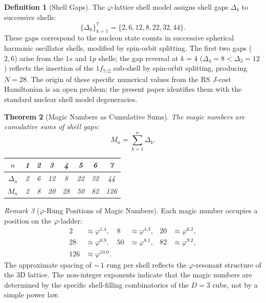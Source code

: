 \documentclass[12pt,a4paper]{article}
\newtheorem{theorem}{Theorem}[section]
\theoremstyle{definition}
\newtheorem{definition}[theorem]{Definition}
\theoremstyle{remark}
\newtheorem{remark}[theorem]{Remark}
\begin{document}
\begin{definition}[Shell Gaps]
The $\varphi$-lattice shell model assigns shell gaps
$\Delta_k$ to successive shells:
\begin{equation}
  \{\Delta_k\}_{k=1}^{7} = \{2, 6, 12, 8, 22, 32, 44\}.
\end{equation}
These gaps correspond to the nucleon state counts in successive
spherical harmonic oscillator shells, modified by spin-orbit
splitting.  The first two gaps ($2, 6$) arise from the $1s$ and
$1p$ shells; the gap reversal at $k=4$ ($\Delta_4 = 8 < \Delta_3 = 12$)
reflects the insertion of the $1f_{7/2}$ sub-shell by spin-orbit
splitting, producing $N = 28$.  The origin of these specific
numerical values from the RS $J$-cost Hamiltonian is an open
problem; the present paper identifies them with the standard
nuclear shell model degeneracies.
\end{definition}

\begin{theorem}[Magic Numbers as Cumulative Sums]
\label{thm:magic}
The magic numbers are cumulative sums of shell gaps:
\begin{equation}
  M_n = \sum_{k=1}^{n} \Delta_k.
\end{equation}
\begin{center}
\renewcommand{\arraystretch}{1.2}
\begin{tabular}{@{}cccccccc@{}}
\toprule
$n$ & 1 & 2 & 3 & 4 & 5 & 6 & 7 \\
\midrule
$\Delta_n$ & 2 & 6 & 12 & 8 & 22 & 32 & 44 \\
$M_n$ & 2 & 8 & 20 & 28 & 50 & 82 & 126 \\
\bottomrule
\end{tabular}
\end{center}
\end{theorem}

\begin{remark}[$\varphi$-Rung Positions of Magic Numbers]
Each magic number occupies a position on the
$\varphi$-ladder:
\begin{align}
  2 &\approx \varphi^{1.4}, &
  8 &\approx \varphi^{4.3}, &
  20 &\approx \varphi^{6.2}, \\
  28 &\approx \varphi^{6.9}, &
  50 &\approx \varphi^{8.1}, &
  82 &\approx \varphi^{9.2}, \\
  126 &\approx \varphi^{10.0}. & &
\end{align}
The approximate spacing of ${\sim}\,1$ rung per shell
reflects the $\varphi$-resonant structure of the 3D
lattice.  The non-integer exponents indicate that the
magic numbers are determined by the specific shell-filling
combinatorics of the $D = 3$ cube, not by a simple
power law.
\end{remark}
\end{document}
